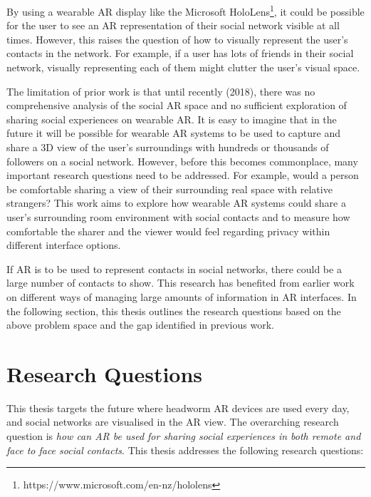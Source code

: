 By using a wearable AR display like the Microsoft HoloLens\footnote{https://www.microsoft.com/en-nz/hololens}, it could be possible for the user to see an AR representation of their social network visible at all times. However, this raises the question of how to visually represent the user's contacts in the network. For example, if a user has lots of friends in their social network, visually representing each of them might clutter the user's visual space.

The limitation of prior work is that until recently (2018), there was no comprehensive analysis of the social AR space and no sufficient exploration of sharing social experiences on wearable AR. It is easy to imagine that in the future it will be possible for wearable AR systems to be used to capture and share a 3D view of the user's surroundings with hundreds or thousands of followers on a social network. However, before this becomes commonplace, many important research questions need to be addressed. For example, would a person be comfortable sharing a view of their surrounding real space with relative strangers? This work aims to explore how wearable AR systems could share a user's surrounding room environment with social contacts and to measure how comfortable the sharer and the viewer would feel regarding privacy within different interface options. 

If AR is to be used to represent contacts in social networks, there could be a large number of contacts to show. This research has benefited from earlier work on different ways of managing large amounts of information in AR interfaces. In the following section, this thesis outlines the research questions based on the above problem space and the gap identified in previous work.

\section{Research Questions}

This thesis targets the future where headworm AR devices are used every day, and social networks are visualised in the AR view. The overarching research question is \textit{how can AR be used for sharing social experiences in both remote and face to face social contacts}. This thesis addresses the following research questions: 

